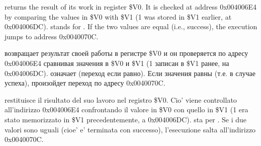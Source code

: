 


\ifdefined\ENGLISH
\scanf returns the result of its work in register \$V0. It is checked at address 0x004006E4
by comparing the values in \$V0 with \$V1 (1 was stored in \$V1 earlier, at 0x004006DC).
 stands for .
If the two values are equal (i.e., success), the execution jumps to address 0x0040070C.
\fi

\ifdefined\RUSSIAN
\scanf возвращает результат своей работы в регистре \$V0 и он проверяется по адресу 0x004006E4
сравнивая значения в \$V0 и \$V1 (1 записан в \$V1 ранее, на 0x004006DC).
 означает  (переход если равно).
Если значения равны (т.е. в случае успеха), произойдет переход по адресу 0x0040070C.
\fi

\ifdefined\ITALIAN
\scanf restituisce il risultato del suo lavoro nel registro \$V0. Cio' viene controllato all'indirizzo 0x004006E4
confrontando il valore in \$V0 con quello in \$V1 (1 era stato memorizzato in \$V1 precedentemente, a 0x004006DC).
 sta per .
Se i due valori sono uguali (cioe' \scanf e' terminata con successo), l'esecuzione salta all'indirizzo 0x0040070C.
\fi